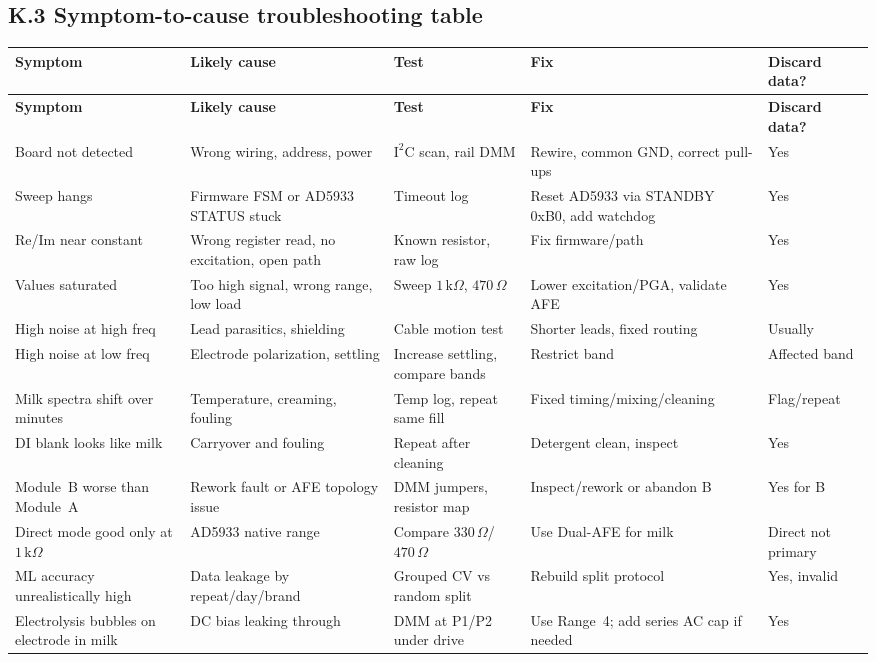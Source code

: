 \documentclass[11pt,a4paper]{article}
\newcommand{\kohm}[1]{\ensuremath{#1\,\mathrm{k}\Omega}}
\newcommand{\Rohm}[1]{\ensuremath{#1\,\Omega}}
\begin{document}
\subsection{K.3 Symptom-to-cause troubleshooting table}

\scriptsize
\begin{xltabular}{\textwidth}{L{26mm}L{32mm}L{28mm}L{31mm}L{18mm}}
\toprule
\textbf{Symptom} & \textbf{Likely cause} & \textbf{Test} & \textbf{Fix} & \textbf{Discard data?}\\
\midrule
\endfirsthead
\toprule
\textbf{Symptom} & \textbf{Likely cause} & \textbf{Test} & \textbf{Fix} & \textbf{Discard data?}\\
\midrule
\endhead

Board not detected & Wrong wiring, address, power & $\mathrm{I^2C}$ scan, rail DMM & Rewire, common GND, correct pull-ups & Yes\\
Sweep hangs & Firmware FSM or AD5933 STATUS stuck & Timeout log & Reset AD5933 via STANDBY 0xB0, add watchdog & Yes\\
Re/Im near constant & Wrong register read, no excitation, open path & Known resistor, raw log & Fix firmware/path & Yes\\
Values saturated & Too high signal, wrong range, low load & Sweep \kohm{1}, \Rohm{470} & Lower excitation/PGA, validate AFE & Yes\\
High noise at high freq & Lead parasitics, shielding & Cable motion test & Shorter leads, fixed routing & Usually\\
High noise at low freq & Electrode polarization, settling & Increase settling, compare bands & Restrict band & Affected band\\
Milk spectra shift over minutes & Temperature, creaming, fouling & Temp log, repeat same fill & Fixed timing/mixing/cleaning & Flag/repeat\\
DI blank looks like milk & Carryover and fouling & Repeat after cleaning & Detergent clean, inspect & Yes\\
Module~B worse than Module~A & Rework fault or AFE topology issue & DMM jumpers, resistor map & Inspect/rework or abandon B & Yes for B\\
Direct mode good only at \kohm{1} & AD5933 native range & Compare \Rohm{330}/\Rohm{470} & Use Dual-AFE for milk & Direct not primary\\
ML accuracy unrealistically high & Data leakage by repeat/day/brand & Grouped CV vs random split & Rebuild split protocol & Yes, invalid\\
Electrolysis bubbles on electrode in milk & DC bias leaking through & DMM at P1/P2 under drive & Use Range~4; add series AC cap if needed & Yes\\
\bottomrule
\end{xltabular}
\normalsize
\end{document}

